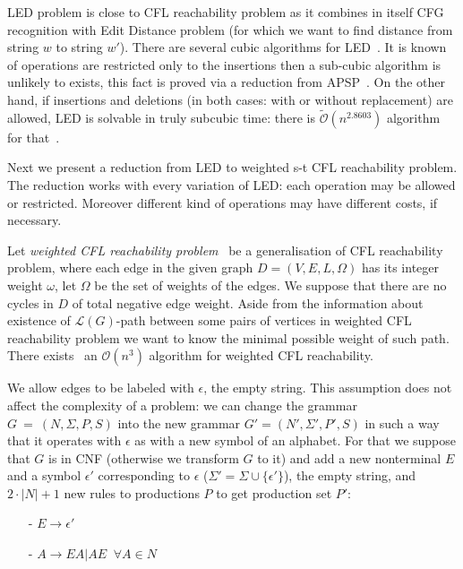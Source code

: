 \documentclass[12pt]{article}
\begin{document}
LED problem is close to CFL reachability problem as it combines in itself CFG recognition with Edit Distance problem (for which we want to find distance from string $w$ to string $w'$). There are several cubic algorithms for LED~\cite{10.1137/0201022, 10.1016/0020-0190(95)00007-Y}. It is known of operations are restricted only to the insertions then a sub-cubic algorithm is unlikely to exists, this fact is proved via a reduction from APSP~\cite{DBLP:journals/corr/Saha14, 10.1145/3186893}. On the other hand, if insertions and deletions (in both cases: with or without replacement) are allowed, LED is solvable in truly subcubic time: there is $\tilde{\mathcal{O}}(n^{2.8603})$ algorithm for that~\cite{DBLP:journals/corr/BringmannGSW17}.

Next we present a reduction from LED to weighted s-t CFL reachability problem. The reduction works with every variation of LED: each operation may be allowed or restricted. Moreover different kind of operations may have different costs, if necessary. 

Let \textit{weighted CFL reachability problem}~\cite{lspidwnapew} be a generalisation of CFL reachability problem, where each edge in the given graph $D=(V, E, L, \Omega)$ has its integer weight $\omega$, let $\Omega$ be the set of weights of the edges. We suppose that there are no cycles in $D$ of total negative edge weight. Aside from the information about existence of $\mathcal{L}(G)$-path between some pairs of vertices in weighted CFL reachability problem we want to know the minimal possible weight of such path. There exists~\cite{lspidwnapew} an $\mathcal{O}(n^3)$ algorithm for weighted CFL reachability.

We allow edges to be labeled with $\epsilon$, the empty string. This assumption does not affect the complexity of a problem: we can change the grammar $G~=~(N, \Sigma, P, S)$ into the new grammar $G' = (N', \Sigma', P', S)$ in such a way that it operates with $\epsilon$ as with a new symbol of an alphabet. For that we suppose that $G$ is in CNF (otherwise we transform $G$ to it) and add a new nonterminal $E$ and a symbol $\epsilon'$ corresponding to $\epsilon$ ($\Sigma' = \Sigma \cup \{\epsilon'\}$), the empty string, and $2 \cdot |N| + 1$ new rules to productions $P$ to get production set $P'$:

\begin{itemize}
    \item[-] $E \rightarrow \epsilon'$
    \item[-] $A \rightarrow EA | AE \;\; \forall A \in N$
\end{itemize}
\end{document}
